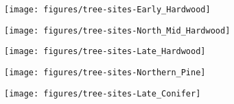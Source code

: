 \clearpage

\begin{figure}[ht]
  \centering
  \texttt{[image: figures/tree-sites-Early\_Hardwood]}
  \caption{\label{fig:tree-sites-EH} }
\end{figure}

\clearpage

\begin{figure}[ht]
  \centering
  \texttt{[image: figures/tree-sites-North\_Mid\_Hardwood]}
  \caption{\label{fig:tree-sites-MH} }
\end{figure}

\clearpage

\begin{figure}[ht]
  \centering
  \texttt{[image: figures/tree-sites-Late\_Hardwood]}
  \caption{\label{fig:tree-sites-LH} }
\end{figure}

\clearpage

\begin{figure}[ht]
  \centering
  \texttt{[image: figures/tree-sites-Northern\_Pine]}
  \caption{\label{fig:tree-sites-P} }
\end{figure}

\clearpage

\begin{figure}[ht]
  \centering
  \texttt{[image: figures/tree-sites-Late\_Conifer]}
  \caption{\label{fig:tree-sites-LC} }
\end{figure}





